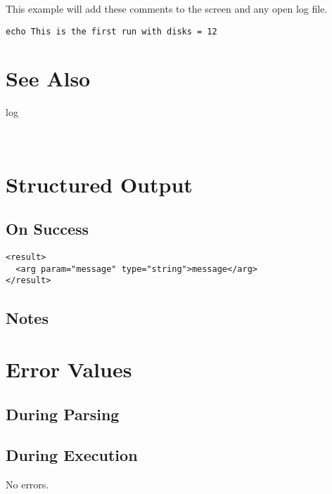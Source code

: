 \documentclass[10pt]{article}
\begin{document}
 This example will add these comments to the screen and any open log file. \begin{verbatim}
echo This is the first run with disks = 12

\end{verbatim}

\section*{ See Also }
\begin{description}
log

\end{description}


 \\ 

\section*{ Structured Output }
\subsection*{ On Success }
\begin{verbatim}
<result>
  <arg param="message" type="string">message</arg>
</result>

\end{verbatim}
\subsection*{ Notes }
\section*{ Error Values }
\subsection*{ During Parsing }
\subsection*{ During Execution }


 No errors. 
\end{document}

